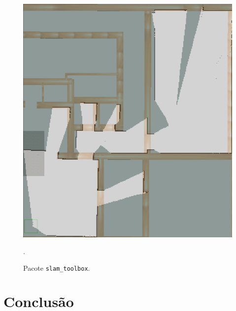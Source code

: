 \documentclass[repeatfields,xlists,xpacks,oneside,yearsonly]{ufrgscca}
\begin{document}
\begin{figure}[h]
        {
            \centering
            \caption{Pacote \texttt{slam\_toolbox}.}
            \label{fig:mapping_slam_toolbox}
            \includegraphics[width=0.6\linewidth]{slam_toolbox_map-compared.png}\\
        }
        {.}
\end{figure}



\chapter{Conclusão}
\label{conclusao}


\printbibliography

%
%
%
\end{document}
